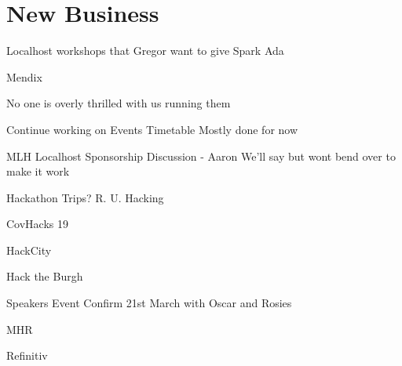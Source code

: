 \documentclass[11pt,hacksoc]{meetingmins}
\begin{document}
\section{New Business}
\begin{items}
	\item
	Localhost workshops that Gregor want to give
		\subitem
		Spark Ada
		
		\subitem
		Mendix
		
		\subitem
		No one is overly thrilled with us running them
		
	\item
	Continue working on Events Timetable
		\subitem
		Mostly done for now
	
	\item
	MLH Localhost Sponsorship Discussion - Aaron
		\subitem
		We'll say but wont bend over to make it work
	
	\item
	Hackathon Trips?
		\subitem
		R. U. Hacking
		
		\subitem
		CovHacks 19
		
		\subitem
		HackCity
		
		\subitem
		Hack the Burgh
	
	\item
	Speakers Event
		\subitem
		Confirm 21st March with Oscar and Rosies
		
		\subitem
			\subsubitem
			MHR
			
			\subsubitem
			Refinitiv
	
\end{items}
\vspace{1em}
\end{document}
